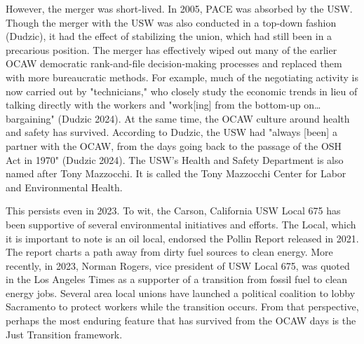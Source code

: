 \documentclass[12pt]{article}
\begin{document}
However, the merger was short-lived. In 2005, PACE was absorbed by the USW. Though the merger with the USW was also conducted in a top-down fashion (Dudzic), it had the effect of stabilizing the union, which had still been in a precarious position. The merger has effectively wiped out many of the earlier OCAW democratic rank-and-file decision-making processes and replaced them with more bureaucratic methods. For example, much of the negotiating activity is now carried out by "technicians," who closely study the economic trends in lieu of talking directly with the workers and "work[ing] from the bottom-up on…bargaining" (Dudzic 2024). At the same time, the OCAW culture around health and safety has survived. According to Dudzic, the USW had "always [been] a partner with the OCAW, from the days going back to the passage of the OSH Act in 1970" (Dudzic 2024). The USW’s Health and Safety Department is also named after Tony Mazzocchi. It is called the Tony Mazzocchi Center for Labor and Environmental Health.

This persists even in 2023. To wit, the Carson, California USW Local 675 has been supportive of several environmental initiatives and efforts. The Local, which it is important to note is an oil local, endorsed the Pollin Report released in 2021. The report charts a path away from dirty fuel sources to clean energy. More recently, in 2023, Norman Rogers, vice president of USW Local 675, was quoted in the Los Angeles Times as a supporter of a transition from fossil fuel to clean energy jobs. Several area local unions have launched a political coalition to lobby Sacramento to protect workers while the transition occurs. From that perspective, perhaps the most enduring feature that has survived from the OCAW days is the Just Transition framework.


\end{document}
